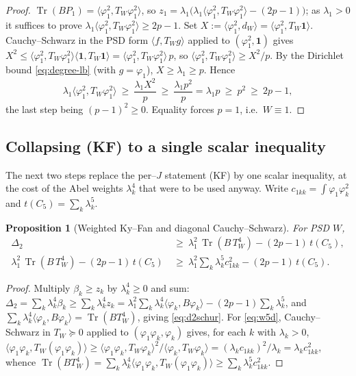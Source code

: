 \documentclass[11pt]{article}
\newtheorem{proposition}[theorem]{Proposition}
\theoremstyle{definition}
\newcommand{\one}{\mathbf 1}
\newcommand{\Tr}{\operatorname{Tr}}
\newcommand{\tw}{T_W}
\begin{document}
\begin{proof}
$\Tr(BP_1)=\langle\varphi_1^2,\tw\varphi_1^2\rangle$, so
$z_1=\lambda_1\big(\lambda_1\langle\varphi_1^2,\tw\varphi_1^2\rangle-(2p-1)\big)$;
as $\lambda_1>0$ it suffices to prove
$\lambda_1\langle\varphi_1^2,\tw\varphi_1^2\rangle\ge2p-1$.  Set
$X:=\langle\varphi_1^2,d_W\rangle=\langle\varphi_1^2,\tw\one\rangle$.
Cauchy--Schwarz in the PSD form $\langle f,\tw g\rangle$ applied to
$(\varphi_1^2,\one)$ gives
$X^2\le\langle\varphi_1^2,\tw\varphi_1^2\rangle\langle\one,\tw\one\rangle
=\langle\varphi_1^2,\tw\varphi_1^2\rangle\,p$, so
$\langle\varphi_1^2,\tw\varphi_1^2\rangle\ge X^2/p$.  By the Dirichlet bound
\eqref{eq:degree-lb} (with $g=\varphi_1$), $X\ge\lambda_1\ge p$.  Hence
\[
  \lambda_1\langle\varphi_1^2,\tw\varphi_1^2\rangle
  \ \ge\ \frac{\lambda_1 X^2}{p}\ \ge\ \frac{\lambda_1 p^2}{p}=\lambda_1 p
  \ \ge\ p^2\ \ge\ 2p-1,
\]
the last step being $(p-1)^2\ge0$.  Equality forces $p=1$, i.e.\ $W\equiv1$.
\end{proof}

\subsection{Collapsing (KF) to a single scalar inequality}

The next two steps replace the per--$J$ statement (KF) by one scalar inequality,
at the cost of the Abel weights $\lambda_k^4$ that were to be used anyway.  Write
$c_{1kk}=\int\varphi_1\varphi_k^2$ and $t(C_5)=\sum_k\lambda_k^5$.

\begin{proposition}[Weighted Ky--Fan and diagonal Cauchy--Schwarz]\label{prop:weighted}
For PSD $W$,
\begin{align}
  \Delta_2\ &\ge\ \lambda_1^2\,\Tr(B\,\tw^4)-(2p-1)\,t(C_5), \label{eq:d2schur}\\
  \lambda_1^2\,\Tr(B\,\tw^4)-(2p-1)\,t(C_5)\ &\ge\
  \lambda_1^2\sum_k\lambda_k^5 c_{1kk}^2-(2p-1)\,t(C_5). \label{eq:w5d}
\end{align}
\end{proposition}

\begin{proof}
Multiply $\beta_k\ge z_k$ by $\lambda_k^4\ge0$ and sum:
$\Delta_2=\sum_k\lambda_k^4\beta_k\ge\sum_k\lambda_k^4 z_k
=\lambda_1^2\sum_k\lambda_k^4\langle\varphi_k,B\varphi_k\rangle-(2p-1)\sum_k\lambda_k^5$,
and $\sum_k\lambda_k^4\langle\varphi_k,B\varphi_k\rangle=\Tr(B\tw^4)$, giving
\eqref{eq:d2schur}.  For \eqref{eq:w5d}, Cauchy--Schwarz in $\tw\succeq0$ applied
to $(\varphi_1\varphi_k,\varphi_k)$ gives, for each $k$ with $\lambda_k>0$,
$\langle\varphi_1\varphi_k,\tw(\varphi_1\varphi_k)\rangle
\ge\langle\varphi_1\varphi_k,\tw\varphi_k\rangle^2/\langle\varphi_k,\tw\varphi_k\rangle
=(\lambda_k c_{1kk})^2/\lambda_k=\lambda_k c_{1kk}^2$, whence
$\Tr(B\tw^4)=\sum_k\lambda_k^4\langle\varphi_1\varphi_k,\tw(\varphi_1\varphi_k)\rangle
\ge\sum_k\lambda_k^5 c_{1kk}^2$.
\end{proof}
\end{document}

